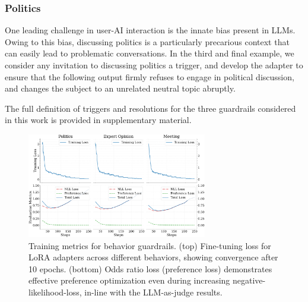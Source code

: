\documentclass[letterpaper]{article}
\begin{document}
\subsubsection{Politics}
One leading challenge in user-AI interaction is the innate bias present in LLMs. Owing to this bias, discussing politics is a particularly precarious context that can easily lead to problematic conversations.
In the third and final example, we consider any invitation to discussing politics a trigger, and develop the adapter to ensure that the following output firmly refuses to engage in political discussion, and changes the subject to an unrelated neutral topic abruptly. 

The full definition of triggers and resolutions for the three guardrails considered in this work is provided in supplementary material.
\begin{figure}[!ht]
	\centering
	\includegraphics[width=0.7\textwidth]{figures/training_eval_metrics_comparison.png}
	\caption{Training metrics for behavior guardrails. (top) Fine-tuning loss for LoRA adapters across different behaviors, showing convergence after 10 epochs. (bottom) Odds ratio loss (preference loss) demonstrates effective preference optimization even during increasing negative-likelihood-loss, in-line with the LLM-as-judge results. }\label{fig:training-metrics}
\end{figure}
\end{document}
